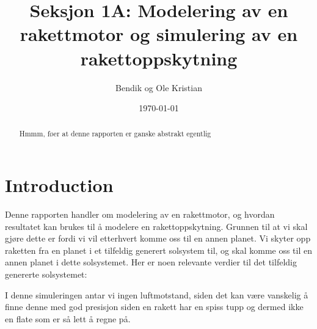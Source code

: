 \documentclass[reprint,english,notitlepage]{revtex4-1}
\begin{document}
\title{Seksjon 1A: Modelering av en rakettmotor og simulering av en rakettoppskytning}
\author{Bendik og Ole Kristian}
\date{\today}
\noaffiliation                %
\begin{abstract}
	Hmmm, føer at denne rapporten er ganske abstrakt egentlig
\end{abstract}
\maketitle                    %

\section{Introduction}
	Denne rapporten handler om modelering av en rakettmotor, og hvordan resultatet
	kan brukes til å modelere en rakettoppskytning. Grunnen til at vi skal gjøre dette
	er fordi vi vil etterhvert komme oss til en annen planet. Vi skyter opp raketten
	fra en planet i et tilfeldig generert solsystem til, og skal komme oss til
	en annen planet i dette solsystemet. Her er noen relevante verdier til det
	tilfeldig genererte solsystemet:

	\begin{table}[h]
		\caption{Solsystemverdier}\label{solartable}
	\end{table}
	I denne simuleringen antar vi ingen luftmotstand, siden det kan være vanskelig å finne
	denne med god presisjon siden en rakett har en spiss tupp og dermed ikke en flate som er
	så lett å regne på.
\end{document}
